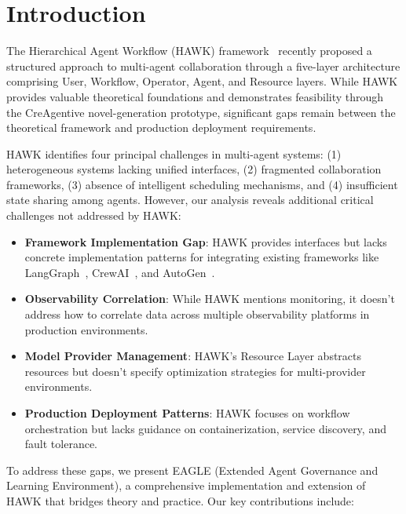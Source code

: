 \documentclass[conference]{IEEEtran}
\begin{document}
\section{Introduction}

The Hierarchical Agent Workflow (HAWK) framework~\cite{hawk2025} recently proposed a structured approach to multi-agent collaboration through a five-layer architecture comprising User, Workflow, Operator, Agent, and Resource layers. While HAWK provides valuable theoretical foundations and demonstrates feasibility through the CreAgentive novel-generation prototype, significant gaps remain between the theoretical framework and production deployment requirements.

HAWK identifies four principal challenges in multi-agent systems: (1) heterogeneous systems lacking unified interfaces, (2) fragmented collaboration frameworks, (3) absence of intelligent scheduling mechanisms, and (4) insufficient state sharing among agents. However, our analysis reveals additional critical challenges not addressed by HAWK:

\begin{itemize}
    \item \textbf{Framework Implementation Gap}: HAWK provides interfaces but lacks concrete implementation patterns for integrating existing frameworks like LangGraph~\cite{langgraph2024}, CrewAI~\cite{crewai2024}, and AutoGen~\cite{wu2023autogen}.
    
    \item \textbf{Observability Correlation}: While HAWK mentions monitoring, it doesn't address how to correlate data across multiple observability platforms in production environments.
    
    \item \textbf{Model Provider Management}: HAWK's Resource Layer abstracts resources but doesn't specify optimization strategies for multi-provider environments.
    
    \item \textbf{Production Deployment Patterns}: HAWK focuses on workflow orchestration but lacks guidance on containerization, service discovery, and fault tolerance.
\end{itemize}

To address these gaps, we present EAGLE (Extended Agent Governance and Learning Environment), a comprehensive implementation and extension of HAWK that bridges theory and practice. Our key contributions include:
\end{document}
